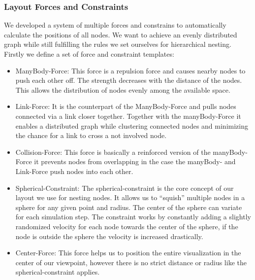 \subsubsection{Layout Forces and Constraints}
We developed a system of multiple forces and constrains to automatically calculate the positions of all nodes. We want to achieve an evenly distributed graph while still fulfilling the rules we set ourselves for hierarchical nesting. Firstly we define a set of force and constraint templates:
\begin{itemize}
    \item ManyBody-Force: This force is a repulsion force and causes nearby nodes to push each other off. The strength decreases with the distance of the nodes. This allows the distribution of nodes evenly among the available space.
    \item Link-Force: It is the counterpart of the ManyBody-Force and pulls nodes connected via a link closer together. Together with the manyBody-Force it enables a distributed graph while clustering connected nodes and minimizing the chance for a link to cross a not involved node.
    \item Collision-Force: This force is basically a reinforced version of the manyBody-Force it prevents nodes from overlapping in the case the manyBody- and Link-Force push nodes into each other.
    \item Spherical-Constraint: The spherical-constraint is the core concept of our layout we use for nesting nodes. It allows us to “squish” multiple nodes in a sphere for any given point and radius. The center of the sphere can variate for each simulation step. The constraint works by constantly adding a slightly randomized velocity for each node towards the center of the sphere, if the node is outside the sphere the velocity is increased drastically.
    \item Center-Force: This force helps us to position the entire visualization in the center of our viewpoint, however there is no strict distance or radius like the spherical-constraint applies.
\end{itemize}

